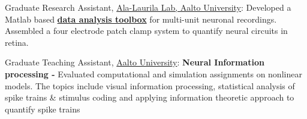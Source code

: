 
\inlineheadsection
  {Graduate Research Assistant, \href{http://ala-laurila.biosci.helsinki.fi/}{Ala-Laurila Lab, Aalto University}:}
  {Developed a Matlab based \href{https://github.com/Schwartz-AlaLaurila-Labs/sa-labs-analysis}{\textbf{data analysis toolbox}} 
  for multi-unit neuronal recordings. Assembled a four electrode patch clamp system to quantify neural circuits in retina.}

  \vspace{0.5em}

\inlineheadsection
{Graduate Teaching Assistant, \href{http://www.aalto.fi}{Aalto University}:}
{\textbf{Neural Information processing - }Evaluated computational and simulation assignments on  nonlinear models. The topics include visual information processing, statistical analysis of spike trains 
\& stimulus coding and applying information theoretic approach to quantify spike trains}
